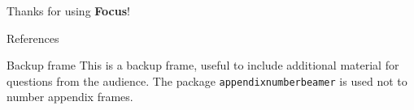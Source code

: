 \documentclass{beamer}
\begin{document}
    \begin{frame}[focus]
        Thanks for using \textbf{Focus}!
    \end{frame}
    
    \appendix
    \begin{frame}{References}
        \nocite{*}
        
        
    \end{frame}
    
    \begin{frame}{Backup frame}
        This is a backup frame, useful to include additional material for questions from the audience.
        \vfill
        The package \texttt{appendixnumberbeamer} is used not to number appendix frames.
    \end{frame}
\end{document}
